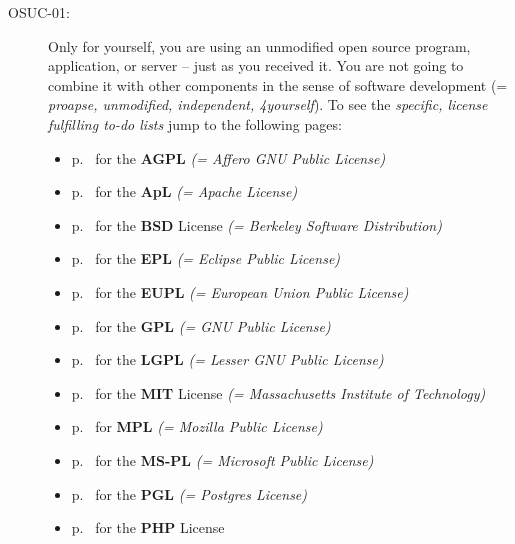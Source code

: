 \begin{description}
\label{OSUCList}
\item[OSUC-01:]\label{OSUC-01-DEF}
Only for yourself, you are using an unmodified open source program, application,
or server -- just as you received it. You are not going to combine it with other
components in the sense of software development (= \textit{proapse, unmodified,
independent, 4yourself}). 
To see the \textit{specific, license fulfilling to-do lists} jump to the
following pages:
  \begin{itemize}
    \item p.\ \pageref{OSUC-01-AGPL} for the \textbf{AGPL}
      \textit{(= Affero GNU Public License)} 
    \item p.\ \pageref{OSUC-01-Apache20} for the \textbf{ApL}
      \textit{(= Apache License)}
    \item p.\ \pageref{OSUC-01-BSD} for the \textbf{BSD} License
      \textit{(= Berkeley Software Distribution)}
    \item p.\ \pageref{OSUC-01-EPL} for the \textbf{EPL}
      \textit{(= Eclipse Public License)}     
    \item p.\ \pageref{OSUC-01-EUPL} for the \textbf{EUPL}
      \textit{(= European Union Public License)} 
    \item p.\ \pageref{OSUC-01-GPL} for the \textbf{GPL}
       \textit{(= GNU Public License)} 
    \item p.\ \pageref{OSUC-01-LGPL} for the \textbf{LGPL}
      \textit{(= Lesser GNU Public License)}           
    \item p.\ \pageref{OSUC-01-MIT} for the \textbf{MIT} License
       \textit{(= Massachusetts Institute of Technology)} 
    \item p.\ \pageref{OSUC-01-MPL} for \textbf{MPL}
      \textit{(= Mozilla Public License)}     
    \item p.\ \pageref{OSUC-01-MS-PL} for the \textbf{MS-PL}
      \textit{(= Microsoft Public License)} 
    \item p.\ \pageref{OSUC-01-PGL} for the \textbf{PGL}
      \textit{(= Postgres License)} 
    \item p.\ \pageref{OSUC-01-PHP} for the \textbf{PHP} License 
  \end{itemize}


\end{description}
